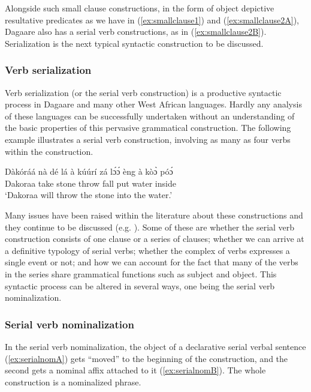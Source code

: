Alongside such small clause constructions, in the form of object depictive resultative predicates as we
have in (\ref{ex:smallclause1}) and (\ref{ex:smallclause2A}), Dagaare also has a serial verb constructions, as in (\ref{ex:smallclause2B}).
Serialization is the next typical syntactic construction to be discussed.

\subsubsection{Verb serialization}
Verb serialization (or the serial verb construction) is a productive syntactic process in
Dagaare and many other West African languages. Hardly any analysis of these languages
can be successfully undertaken without an understanding of the basic properties of this pervasive
grammatical construction. The following example illustrates a serial verb construction,
involving as many as four verbs within the construction.



\ea \gll Dàkóráá nà dé lá à kúúrí zá lɔ́ɔ́ èng à kòɔ̀ póɔ́\\
Dakoraa {\FUT} take {\FOC} {\DEF} stone throw fall put {\DEF} water inside\\
\glt ‘Dakoraa will throw the stone into the water.’\z

Many issues have been raised within the literature about these constructions and they continue
to be discussed (e.g. \citealt{Bodomo1993, Bodomo1997, Bodomo1997Pathfinders}). Some of these are whether the serial verb
construction consists of one clause or a series of clauses; whether we can arrive at a definitive
typology of serial verbs; whether the complex of verbs expresses a single event or not; and
how we can account for the fact that many of the verbs in the series share grammatical
functions such as subject and object. This syntactic process can be altered in several ways,
one being the serial verb nominalization.

\subsubsection{Serial verb nominalization}
In the serial verb nominalization, the object of a declarative serial verbal sentence
(\ref{ex:serialnomA}) gets ``moved'' to the beginning of the construction, and the second gets a nominal affix
attached to it (\ref{ex:serialnomB}). The whole construction is a nominalized phrase.

\ea {}
\z\z 

